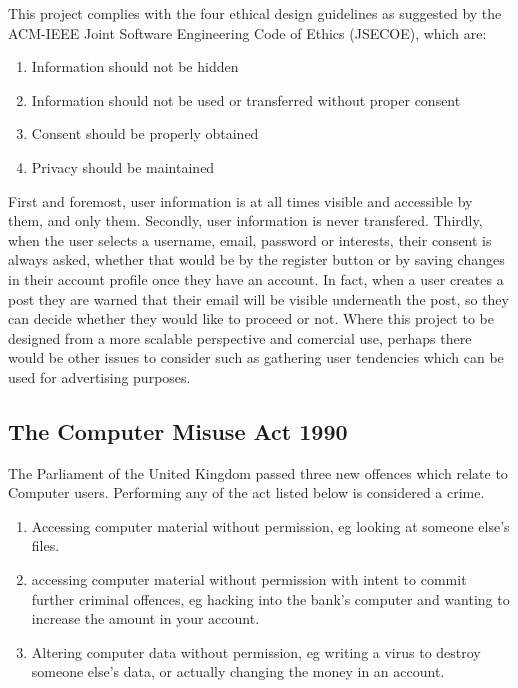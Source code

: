 This project complies with the four ethical design guidelines as suggested by the ACM-IEEE
Joint Software Engineering Code of Ethics (JSECOE), which are:

\begin{enumerate}
  \item Information should not be hidden
  \item Information should not be used or transferred without proper consent
  \item Consent should be properly obtained
  \item Privacy should be maintained
\end{enumerate}

First and foremost, user information is at all times visible and accessible by them, and only them. Secondly, user information is never transfered. Thirdly, when the user selects a username, email, password or interests, their consent is always asked, whether that would be by the register button or by saving changes in their account profile once they have an account. In fact, when a user creates a post they are warned that their email will be visible underneath the post, so they can decide whether they would like to proceed or not. Where this project to be designed from a more scalable perspective and comercial use, perhaps there would be other issues to consider such as gathering user tendencies which can be used for advertising purposes.

\subsection{The Computer Misuse Act 1990}
The Parliament of the United Kingdom passed three new offences which relate to Computer users. Performing any of the act listed below is considered a crime.

\begin{enumerate}
  \item Accessing computer material without permission, eg looking at someone else's files.
  \item accessing computer material without permission with intent to commit further criminal offences, eg hacking into the bank's computer and wanting to increase the amount in your account.
  \item Altering computer data without permission, eg writing a virus to destroy someone else's data, or actually changing the money in an account.
\end{enumerate}

